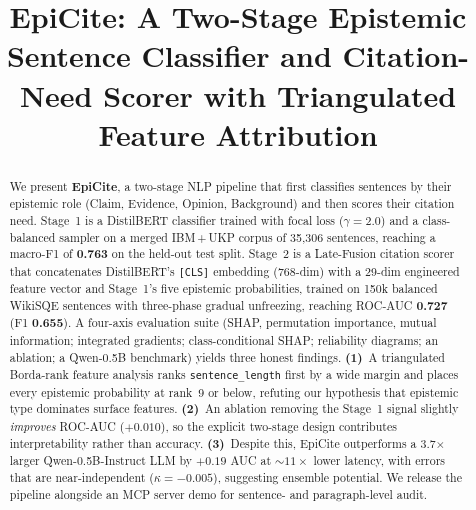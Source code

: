 \documentclass[conference]{IEEEtran}
\begin{document}
\title{EpiCite: A Two-Stage Epistemic Sentence Classifier and Citation-Need
Scorer with Triangulated Feature Attribution}

\author{%
\and
{}
}

\maketitle

\begin{abstract}
We present \textbf{EpiCite}, a two-stage NLP pipeline that first classifies
sentences by their epistemic role (Claim, Evidence, Opinion, Background) and
then scores their citation need. Stage~1 is a DistilBERT classifier trained
with focal loss ($\gamma{=}2.0$) and a class-balanced sampler on a merged
IBM\,+\,UKP corpus of 35{,}306 sentences, reaching a macro-F1 of
\textbf{0.763} on the held-out test split. Stage~2 is a Late-Fusion citation
scorer that concatenates DistilBERT's \texttt{[CLS]} embedding (768-dim) with
a 29-dim engineered feature vector and Stage~1's five epistemic
probabilities, trained on 150k balanced WikiSQE sentences with three-phase
gradual unfreezing, reaching ROC-AUC \textbf{0.727} (F1 \textbf{0.655}).
A four-axis evaluation suite (SHAP, permutation importance, mutual
information; integrated gradients; class-conditional SHAP; reliability
diagrams; an ablation; a Qwen-0.5B benchmark) yields three honest findings.
\textbf{(1)}~A triangulated Borda-rank feature analysis ranks
\texttt{sentence\_length} first by a wide margin and places every epistemic
probability at rank~9 or below, refuting our hypothesis that epistemic type
dominates surface features. \textbf{(2)}~An ablation removing the Stage~1
signal slightly \emph{improves} ROC-AUC ($+0.010$), so the explicit two-stage
design contributes interpretability rather than accuracy. \textbf{(3)}~Despite
this, EpiCite outperforms a 3.7$\times$ larger Qwen-0.5B-Instruct LLM by
$+0.19$ AUC at $\sim\!11\times$ lower latency, with errors that are
near-independent ($\kappa{=}-0.005$), suggesting ensemble potential. We
release the pipeline alongside an MCP server demo for sentence- and
paragraph-level audit.
\end{abstract}
\end{document}
